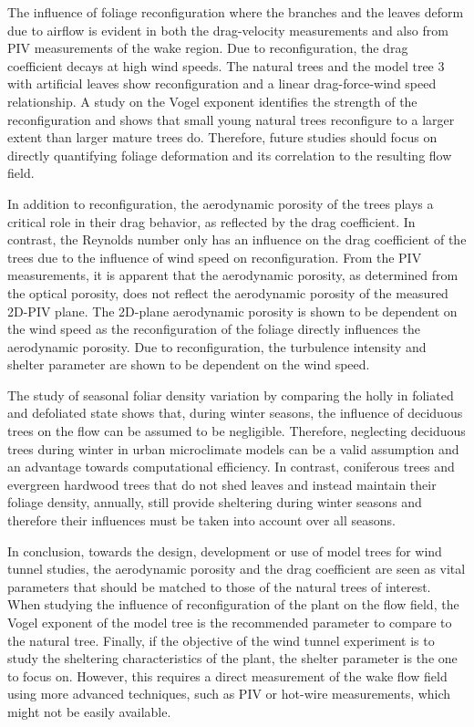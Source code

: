 The influence of foliage reconfiguration where the branches and the leaves deform due to airflow is evident in both the drag-velocity measurements and also from PIV measurements of the wake region. Due to reconfiguration, the drag coefficient decays at high wind speeds. The natural trees and the model tree 3 with artificial leaves show reconfiguration and a linear drag-force-wind speed relationship. A study on the Vogel exponent identifies the strength of the reconfiguration and shows that small young natural trees reconfigure to a larger extent than larger mature trees do. Therefore, future studies should focus on directly quantifying foliage deformation and its correlation to the resulting flow field.

In addition to reconfiguration, the aerodynamic porosity of the trees plays a critical role in their drag behavior, as reflected by the drag coefficient. In contrast, the Reynolds number only has an influence on the drag coefficient of the trees due to the influence of wind speed on reconfiguration. From the PIV measurements, it is apparent that the aerodynamic porosity, as determined from the optical porosity, does not reflect the aerodynamic porosity of the measured 2D-PIV plane. The 2D-plane aerodynamic porosity is shown to be dependent on the wind speed as the reconfiguration of the foliage directly influences the aerodynamic porosity. Due to reconfiguration, the turbulence intensity and shelter parameter are shown to be dependent on the wind speed.

The study of seasonal foliar density variation by comparing the holly in foliated and defoliated state shows that, during winter seasons, the influence of deciduous trees on the flow can be assumed to be negligible. Therefore, neglecting deciduous trees during winter in urban microclimate models can be a valid assumption and an advantage towards computational efficiency. In contrast, coniferous trees and evergreen hardwood trees that do not shed leaves and instead maintain their foliage density, annually, still provide sheltering during winter seasons and therefore their influences must be taken into account over all seasons.

In conclusion, towards the design, development or use of model trees for wind tunnel studies, the aerodynamic porosity and the drag coefficient are seen as vital parameters that should be matched to those of the natural trees of interest. When studying the influence of reconfiguration of the plant on the flow field, the Vogel exponent of the model tree is the recommended parameter to compare to the natural tree. Finally, if the objective of the wind tunnel experiment is to study the sheltering characteristics of the plant, the shelter parameter is the one to focus on. However, this requires a direct measurement of the wake flow field using more advanced techniques, such as PIV or hot-wire measurements, which might not be easily available.

